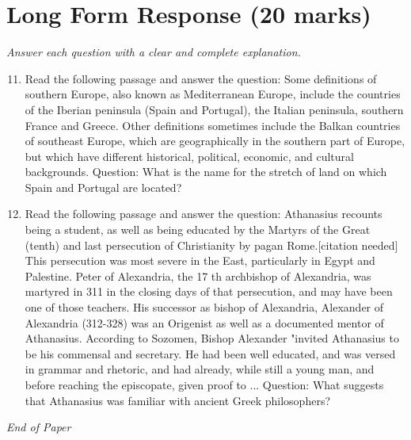 \documentclass[12pt]{article}
\begin{document}
\section*{Long Form Response (20 marks)}
\textit{Answer each question with a clear and complete explanation.}
\begin{enumerate}[label=\arabic*.]
\setcounter{enumi}{10}
\item Read the following passage and answer the question: Some definitions of southern Europe, also known as Mediterranean Europe, include the countries of the Iberian peninsula (Spain and Portugal), the Italian peninsula, southern France and Greece. Other definitions sometimes include the Balkan countries of southeast Europe, which are geographically in the southern part of Europe, but which have different historical, political, economic, and cultural backgrounds. Question: What is the name for the stretch of land on which Spain and Portugal are located?
\item Read the following passage and answer the question: Athanasius recounts being a student, as well as being educated by the Martyrs of the Great (tenth) and last persecution of Christianity by pagan Rome.[citation needed] This persecution was most severe in the East, particularly in Egypt and Palestine. Peter of Alexandria, the 17 th archbishop of Alexandria, was martyred in 311 in the closing days of that persecution, and may have been one of those teachers. His successor as bishop of Alexandria, Alexander of Alexandria (312-328) was an Origenist as well as a documented mentor of Athanasius. According to Sozomen, Bishop Alexander "invited Athanasius to be his commensal and secretary. He had been well educated, and was versed in grammar and rhetoric, and had already, while still a young man, and before reaching the episcopate, given proof to ... Question: What suggests that Athanasius was familiar with ancient Greek philosophers?
\end{enumerate}

\vfill
\noindent\textit{End of Paper}
\end{document}
